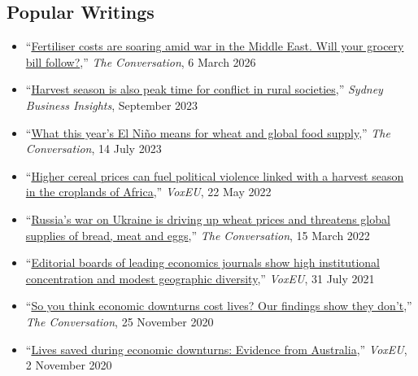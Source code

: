 \documentclass[10pt]{article}
\begin{document}
	\subsection*{Popular Writings}
	
	\begin{itemize}
		\item ``\href{https://theconversation.com/fertiliser-costs-are-soaring-amid-war-in-the-middle-east-will-your-grocery-bill-follow-277511}{Fertiliser costs are soaring amid war in the Middle East. Will your grocery bill follow?},'' \textit{The Conversation}, 6 March 2026
		\item ``\href{https://sbi.sydney.edu.au/harvest-season-is-also-peak-time-for-conflict-in-rural-societies}{Harvest season is also peak time for conflict in rural societies},'' \textit{Sydney Business Insights}, September 2023 
		\item ``\href{https://theconversation.com/what-this-years-el-nino-means-for-wheat-and-global-food-supply-209386}{What this year's El Niño means for wheat and global food supply},'' \textit{The Conversation}, 14 July 2023
		\item ``\href{https://voxeu.org/article/rising-cereal-prices-and-political-violence-croplands-africa}{Higher cereal prices can fuel political violence linked with a harvest season in the croplands of Africa},'' \textit{VoxEU}, 22 May 2022
		\item ``\href{https://theconversation.com/russias-war-on-ukraine-is-driving-up-wheat-prices-and-threatens-global-supplies-of-bread-meat-and-eggs-178879}{Russia’s war on Ukraine is driving up wheat prices and threatens global supplies of bread, meat and eggs},'' \textit{The Conversation}, 15 March 2022
		\item ``\href{https://voxeu.org/article/geographic-diversity-economics-journals-editorial-boards}{Editorial boards of leading economics journals show high institutional concentration and modest geographic diversity},'' \textit{VoxEU}, 31 July 2021
		\item ``\href{https://theconversation.com/so-you-think-economic-downturns-cost-lives-our-findings-show-they-dont-149711}{So you think economic downturns cost lives? Our findings show they don't},'' \textit{The Conversation}, 25 November 2020
		\item ``\href{https://voxeu.org/article/lives-saved-during-economic-downturns}{Lives saved during economic downturns: Evidence from Australia},'' \textit{VoxEU}, 2 November 2020
	\end{itemize}
	
\end{document}
